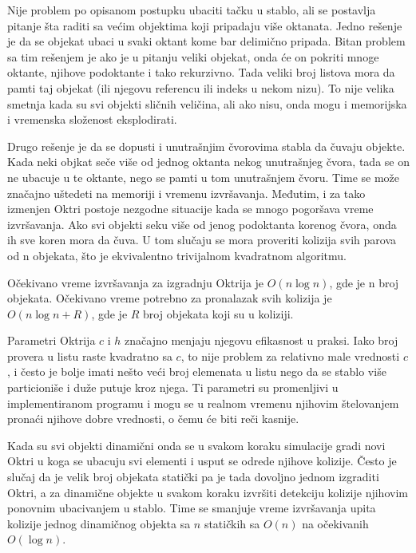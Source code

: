 \documentclass[12pt,oneside]{memoir}
\begin{document}
Nije problem po opisanom postupku ubaciti tačku u stablo, ali se postavlja pitanje šta raditi sa većim objektima
koji pripadaju više oktanata.
Jedno rešenje je da se objekat ubaci u svaki oktant kome bar delimično pripada. 
Bitan problem sa tim rešenjem je ako je u pitanju veliki objekat, onda će on pokriti mnoge oktante, njihove 
podoktante i tako rekurzivno. Tada veliki broj listova mora da pamti taj objekat (ili njegovu referencu ili indeks u nekom nizu).
To nije velika smetnja kada su svi objekti sličnih veličina, ali ako 
nisu, onda mogu i memorijska i vremenska složenost eksplodirati. 

Drugo rešenje je da se dopusti i unutrašnjim čvorovima stabla da čuvaju objekte.
Kada neki objkat seče više od jednog oktanta nekog unutrašnjeg čvora, tada se on ne ubacuje 
u te oktante, nego se pamti u tom unutrašnjem čvoru. Time se može značajno uštedeti na memoriji i vremenu izvršavanja.
Međutim, i za tako izmenjen Oktri postoje nezgodne situacije kada se mnogo pogoršava vreme izvršavanja.
Ako svi objekti seku više od jenog podoktanta korenog čvora, onda ih sve koren mora da čuva. 
U tom slučaju se mora proveriti kolizija svih parova od n objekata, što je ekvivalentno trivijalnom kvadratnom algoritmu.

Očekivano vreme izvršavanja za izgradnju Oktrija je $O(n \log n)$, gde je n broj objekata.
Očekivano vreme potrebno za pronalazak svih kolizija je $O(n \log n + R)$, gde je $R$ broj objekata koji su u koliziji.

Parametri Oktrija $c$ i $h$ značajno menjaju njegovu efikasnost u praksi. 
Iako broj provera u listu raste kvadratno sa $c$, to nije problem za relativno male vrednosti $c$, i često je bolje 
imati nešto veći broj elemenata u listu nego da se stablo više particioniše i duže putuje kroz njega.
Ti parametri su promenljivi u implementiranom programu i mogu se u realnom vremenu njihovim štelovanjem pronaći 
njihove dobre vrednosti, o čemu će biti reči kasnije.

Kada su svi objekti dinamični onda se u svakom koraku simulacije  gradi novi Oktri u
koga se ubacuju svi elementi i usput se odrede njihove kolizije. Često je slučaj da je velik 
broj objekata statički pa je tada dovoljno jednom izgraditi Oktri, a za dinamične objekte u svakom koraku 
izvršiti detekciju kolizije njihovim ponovnim ubacivanjem u stablo. Time se smanjuje vreme izvršavanja upita 
kolizije jednog dinamičnog objekta sa $n$ statičkih sa $O(n)$ na očekivanih $O(\log n)$.
\end{document}

